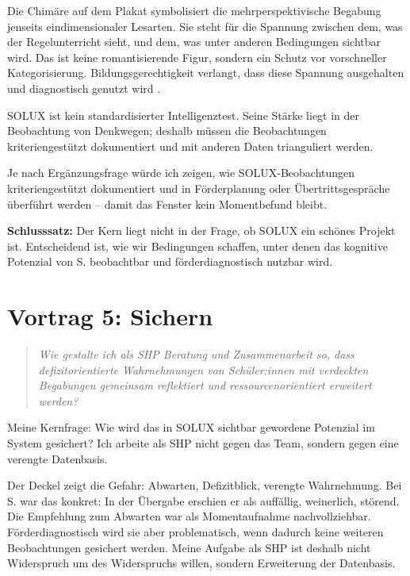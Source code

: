 \documentclass[ngerman, a4paper]{article}
\begin{document}
Die Chimäre auf dem Plakat symbolisiert die mehrperspektivische Begabung
jenseits eindimensionaler Lesarten. Sie steht für die Spannung zwischen dem,
was der Regelunterricht sieht, und dem, was unter anderen Bedingungen sichtbar
wird. Das ist keine romantisierende Figur, sondern ein Schutz vor
vorschneller Kategorisierung. Bildungsgerechtigkeit verlangt, dass diese Spannung
ausgehalten und diagnostisch genutzt wird
\parencites{sedmak2021bildungsgerechtigkeit}{muelleroppliger2021plurale}.

SOLUX ist kein standardisierter Intelligenztest. Seine Stärke liegt in der
Beobachtung von Denkwegen; deshalb müssen die Beobachtungen kriteriengestützt
dokumentiert und mit anderen Daten trianguliert werden.

Je nach Ergänzungsfrage würde ich zeigen, wie SOLUX-Beobachtungen
kriteriengestützt dokumentiert und in Förderplanung oder Übertrittsgespräche
überführt werden -- damit das Fenster kein Momentbefund bleibt.

\textbf{Schlusssatz:} Der Kern liegt nicht in der Frage, ob SOLUX ein schönes
Projekt ist. Entscheidend ist, wie wir Bedingungen schaffen, unter denen das
kognitive Potenzial von S. beobachtbar und förderdiagnostisch nutzbar wird.

\newpage

\section{Vortrag 5: Sichern}
\label{sec:vortrag5}

\begin{quote}\itshape
Wie gestalte ich als SHP Beratung und Zusammenarbeit so, dass defizitorientierte
Wahrnehmungen von Schüler:innen mit verdeckten Begabungen gemeinsam reflektiert
und ressourcenorientiert erweitert werden?
\end{quote}

Meine Kernfrage: Wie wird das in SOLUX sichtbar gewordene Potenzial im System
gesichert? Ich arbeite als SHP nicht gegen das Team, sondern gegen eine
verengte Datenbasis.

Der Deckel zeigt die Gefahr: Abwarten, Defizitblick, verengte Wahrnehmung. Bei
S. war das konkret: In der Übergabe erschien er als auffällig, weinerlich,
störend. Die Empfehlung zum Abwarten war als Momentaufnahme nachvollziehbar.
Förderdiagnostisch wird sie aber problematisch, wenn dadurch keine weiteren
Beobachtungen gesichert werden. Meine Aufgabe als SHP ist deshalb nicht
Widerspruch um des Widerspruchs willen, sondern Erweiterung der Datenbasis.
\end{document}
